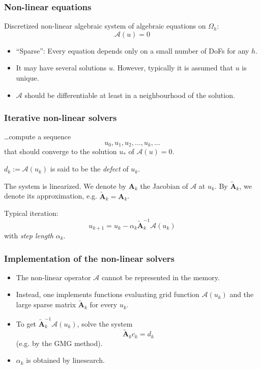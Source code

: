 \documentclass[xcolor=dvipsnames]{beamer}
\begin{document}
\begin{frame} [t]
\frametitle {Non-linear equations}
Discretized {\color{blue} non-linear} algebraic system of algebraic equations on $\Omega_h$:
$$
 \mathcal{A} (u) = 0
$$
\begin{itemize}
 \pause
 \item {\color{blue} ``Sparse''}: Every equation depends only on a small number of DoFs for any $h$.
 \pause
 \item It may have {\color{blue} several solutions} $u$. However, typically it is assumed that $u$ is unique.
 \pause
 \item $\mathcal{A}$ should be differentiable at least in a neighbourhood of the solution.
\end{itemize}
\end{frame}

\begin{frame} [t]
\frametitle {Iterative non-linear solvers}
\dots compute a sequence
$$
 u_0, u_1, u_2, \dots, u_k, \dots
$$
that should converge to the solution $u_{*}$ of $\mathcal{A} (u) = 0$.

\pause
\vspace{2ex}
$d_k := \mathcal{A} (u_k)$ is said to be the \emph{defect} of $u_k$.

\pause
\vspace{2ex}
The system is linearized. We denote by $\mathbf{A}_k$ the Jacobian of
$\mathcal{A}$ at $u_k$. By $\tilde{\mathbf{A}}_k$, we denote its approximation, e.g.
$\tilde{\mathbf{A}}_k = \mathbf{A}_k$.

\pause
\vspace{2ex}
Typical iteration:
$$
 u_{k+1} = u_k - \alpha_k \tilde{\mathbf{A}}_k^{-1} \mathcal{A} (u_k)
$$
with \emph{step length} $\alpha_k$.
\end{frame}

\begin{frame} [t]
\frametitle {Implementation of the non-linear solvers}
\begin{itemize}
 \item The non-linear operator $\mathcal{A}$ {\color{blue} cannot be represented in the memory}.
 \pause
 \item Instead, one implements functions evaluating {\color{blue} grid function} $\mathcal{A} (u_k)$
  and the large sparse matrix $\tilde{\mathbf{A}}_k$ for every $u_k$.
 \pause
 \item To get $\tilde{\mathbf{A}}_k^{-1} \mathcal{A} (u_k)$, solve the system
  $$
   \tilde{\mathbf{A}}_k c_k = d_k
  $$
  (e.g. by the GMG method).
 \pause
 \item $\alpha_k$ is obtained by {\color{blue} linesearch}.
\end{itemize}
\end{frame}
\end{document}
